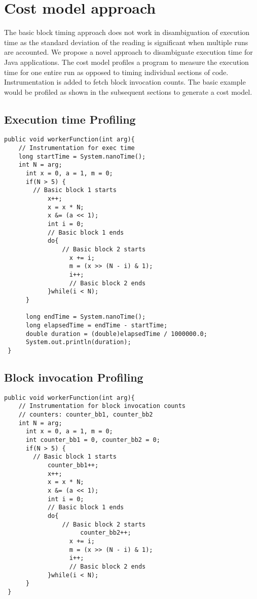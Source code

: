\section{Cost model approach}
The basic block timing approach does not work in disambiguation of execution time as the standard deviation of the reading is significant when multiple runs are accounted. We propose a novel approach to disambiguate execution time for Java applications. The cost model profiles a program to measure the execution time for one entire run as opposed to timing individual sections of code. Instrumentation is added to fetch block invocation counts.  \newline
The basic example would be profiled as shown in the subsequent sections to generate a cost model.

\subsection{Execution time Profiling}
\singlespacing
\begin{lstlisting}
public void workerFunction(int arg){
	// Instrumentation for exec time 
	long startTime = System.nanoTime();
	int N = arg;
      int x = 0, a = 1, m = 0;
      if(N > 5) {
      	// Basic block 1 starts
            x++;
            x = x * N;
            x &= (a << 1);
            int i = 0;
            // Basic block 1 ends
            do{
            	// Basic block 2 starts
                  x += i;
                  m = (x >> (N - i) & 1);
                  i++;
                  // Basic block 2 ends
            }while(i < N);
      }
      
      long endTime = System.nanoTime();
      long elapsedTime = endTime - startTime;
      double duration = (double)elapsedTime / 1000000.0;
      System.out.println(duration);
 }
\end{lstlisting}
\doublespacing

\subsection{Block invocation Profiling}
\singlespacing
\begin{lstlisting}
public void workerFunction(int arg){
	// Instrumentation for block invocation counts
	// counters: counter_bb1, counter_bb2
	int N = arg;
      int x = 0, a = 1, m = 0;
      int counter_bb1 = 0, counter_bb2 = 0;
      if(N > 5) {
      	// Basic block 1 starts
      		counter_bb1++;
            x++;
            x = x * N;
            x &= (a << 1);
            int i = 0;
            // Basic block 1 ends
            do{
            	// Basic block 2 starts
            		 counter_bb2++;
                  x += i;
                  m = (x >> (N - i) & 1);
                  i++;
                  // Basic block 2 ends
            }while(i < N);
      }
 }
\end{lstlisting}
\doublespacing

